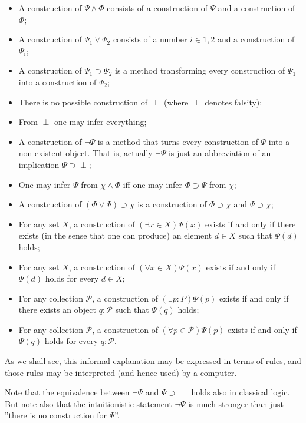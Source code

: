 \begin{itemize}
\item A construction of $\Psi\wedge\Phi$ consists of a construction of $\Psi$
  and a construction of $\Phi$;
\item A construction of $\Psi_{1} \vee \Psi_{2}$ consists of a number
  $i \in {1, 2}$ and a construction of $\Psi_{i}$;
\item A construction of $\Psi_{1} \supset \Psi_{2}$ is a method transforming
  every construction of $\Psi_{1}$ into a construction of $\Psi_{2}$;
\item There is no possible construction of $\perp$ (where $\perp$ denotes
  falsity);
\item From $\perp$ one may infer everything;
\item A construction of $\neg\Psi$ is a method that turns every construction of
  $\Psi$ into a non-existent object. That is, actually $\neg\Psi$ is just an
  abbreviation of an implication $\Psi \supset \perp$;
\item One may infer $\Psi$ from $\chi\wedge\Phi$ iff one may infer
  $\Phi \supset \Psi$ from $\chi$;
\item A construction of $(\Phi \vee \Psi) \supset \chi$ is a construction of
  $\Phi \supset \chi$ and $\Psi \supset \chi$;
\item For any set $X$, a construction of $(\exists x \in X)\Psi(x)$ exists if
  and only if there exists (in the sense that one can produce) an element
  $d \in X$ such that $\Psi(d)$ holds;
\item For any set $X$, a construction of $(\forall x \in X)\Psi(x)$ exists if
  and only if $\Psi(d)$ holds for every $d \in X$;
\item For any collection $\mathcal{P}$, a construction of
  $(\exists p : P)\Psi(p)$ exists if and only if there exists an object
  $q : \mathcal{P}$ such that $\Psi(q)$ holds;
\item For any collection $\mathcal{P}$, a construction of
  $(\forall p \in \mathcal{P})\Psi(p)$ exists if and only if $\Psi(q)$ holds for
  every $q : \mathcal{P}$.
\end{itemize}

As we shall see, this informal explanation may be expressed in terms of rules,
and those rules may be interpreted (and hence used) by a computer.

Note that the equivalence between $\neg\Psi$ and $\Psi\supset\perp$ holds also
in classical logic. But note also that the intuitionistic statement $\neg\Psi$
is much stronger than just ''there is no construction for $\Psi$''.

